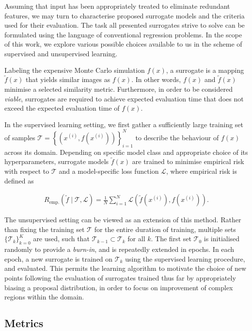 Assuming that input has been appropriately treated to eliminate redundant
features, we may turn to characterise proposed surrogate models and the criteria
used for their evaluation. The task all presented surrogates strive to solve can be
formulated using the language of conventional regression problems. In the scope
of this work, we explore various possible choices available to us in the
scheme of supervised and unsupervised learning.

Labeling the expensive Monte Carlo simulation $f(x)$, a surrogate is a mapping
$\tilde{f}(x)$ that yields similar images as $f(x)$. In other words, $f(x)$ and
$\tilde{f}(x)$ minimise a selected similarity metric. Furthermore, in order to
be considered \textit{viable}, surrogates are required to achieve expected evaluation time
that does not exceed the expected evaluation time of $f(x)$.

In the supervised learning setting, we first gather a sufficiently large
training set of samples $\mathcal{T}=\left\{\left( x^{(i)},f\left(x^{(i)}\right) \right)\right\}_{i=1}^N$
to describe the behaviour of $f(x)$ across its domain.
Depending on specific model class and appropriate choice of its
hyperparameters, surrogate models $\tilde{f}(x)$ are trained to minimise
empirical risk with respect to $\mathcal{T}$ and a model-specific
loss function $\mathcal{L}$, where empirical risk is defined as

\begin{align}
	R_{\text{emp.}}(\tilde{f}\mid\mathcal{T},\mathcal{L})
	=\frac{1}{N}\sum_{i=1}^N
	\mathcal{L}\left(\tilde{f}(x^{(i)}),f(x^{(i)})\right).
\end{align}

The unsupervised setting can be viewed as an extension of this method.
Rather than fixing the training set $\mathcal{T}$ for the entire duration of
training, multiple sets $\{\mathcal{T}_k\}_{k=0}^K$ are used, such that
$\mathcal{T}_{k-1}\subset\mathcal{T}_k$ for all $k$. The first set
$\mathcal{T}_0$ is initialised randomly to provide a \textit{burn-in}, and is
repeatedly extended in epochs. In each epoch, a new surrogate is trained on
$\mathcal{T}_k$ using the supervised learning procedure, and evaluated.
This permits the learning algorithm to motivate the choice of new points following the
evaluation of surrogates trained thus far by appropriately biasing a
proposal distribution, in order to focus on improvement of complex regions
within the domain.


\subsection{Metrics}
\label{sec:metrics}

